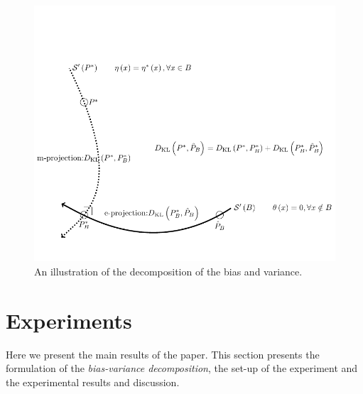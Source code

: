 \documentclass[letterpaper]{article} %
\begin{document}
		\begin{figure}[t]
			\includegraphics[width=\columnwidth]{./BVD_proof.pdf}
			\caption{An illustration of the decomposition of the bias and variance.} \label{fig:bias_variance_decomposition}
		\end{figure}

\section{Experiments} \label{sec:experiment}
	Here we present the main results of the paper. This section presents the formulation of the \textit{bias-variance decomposition}, the set-up of the experiment and the experimental results and discussion.
\end{document}
